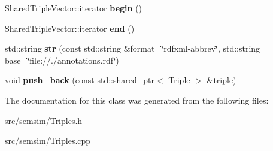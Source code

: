\begin{DoxyCompactItemize}
Shared\+Triple\+Vector\+::iterator {\bfseries begin} ()
\item 
\mbox{\label{classsemsim_1_1Triples_a9551a7d3ecc878b6ff87ddd2c52d6481}} 
Shared\+Triple\+Vector\+::iterator {\bfseries end} ()
\item 
\mbox{\label{classsemsim_1_1Triples_a3fce442d97360b0c6ccb55fdf11f0bf2}} 
std\+::string {\bfseries str} (const std\+::string \&format=\char`\"{}rdfxml-\/abbrev\char`\"{}, std\+::string base=\char`\"{}file\+://./annotations.\+rdf\char`\"{})
\item 
\mbox{\label{classsemsim_1_1Triples_afb9f000468cbe6c68f6c5706f0b2c781}} 
void {\bfseries push\+\_\+back} (const std\+::shared\+\_\+ptr$<$ \hyperlink{classsemsim_1_1Triple}{Triple} $>$ \&triple)
\end{DoxyCompactItemize}


The documentation for this class was generated from the following files\+:\begin{DoxyCompactItemize}
\item 
src/semsim/Triples.\+h\item 
src/semsim/Triples.\+cpp\end{DoxyCompactItemize}
